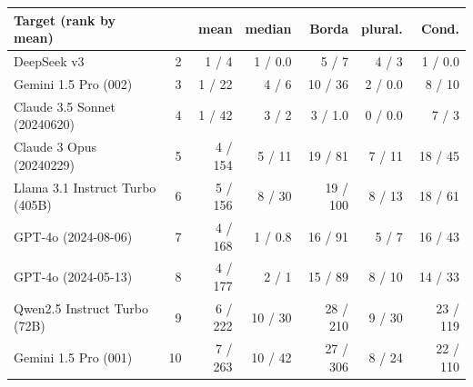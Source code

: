 \begin{tabular}{@{}lrrrrrr@{}}\toprule
Target (rank by mean) & & mean & median & Borda & plural. & Cond.\\\midrule
DeepSeek v3 & 2 & 1 / 4 & 1 / 0.0 & 5 / 7 & 4 / 3 & 1 / 0.0\\
Gemini 1.5 Pro (002) & 3 & 1 / 22 & 4 / 6 & 10 / 36 & 2 / 0.0 & 8 / 10\\
Claude 3.5 Sonnet (20240620) & 4 & 1 / 42 & 3 / 2 & 3 / 1.0 & 0 / 0.0 & 7 / 3\\
Claude 3 Opus (20240229) & 5 & 4 / 154 & 5 / 11 & 19 / 81 & 7 / 11 & 18 / 45\\
Llama 3.1 Instruct Turbo (405B) & 6 & 5 / 156 & 8 / 30 & 19 / 100 & 8 / 13 & 18 / 61\\
GPT-4o (2024-08-06) & 7 & 4 / 168 & 1 / 0.8 & 16 / 91 & 5 / 7 & 16 / 43\\
GPT-4o (2024-05-13) & 8 & 4 / 177 & 2 / 1 & 15 / 89 & 8 / 10 & 14 / 33\\
Qwen2.5 Instruct Turbo (72B) & 9 & 6 / 222 & 10 / 30 & 28 / 210 & 9 / 30 & 23 / 119\\
Gemini 1.5 Pro (001) & 10 & 7 / 263 & 10 / 42 & 27 / 306 & 8 / 24 & 22 / 110\\
\bottomrule\end{tabular}
